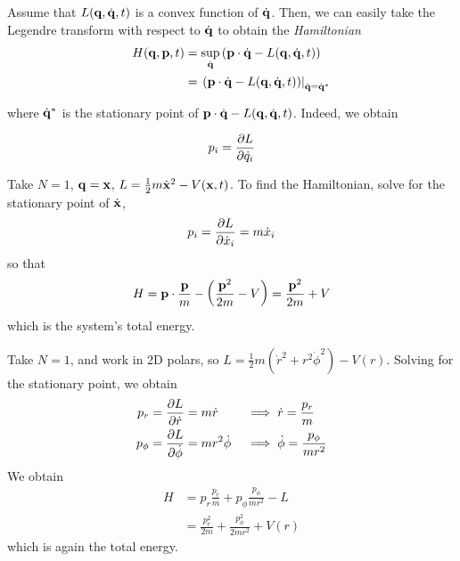 \documentclass{../template/note}
\begin{document}
    Assume that $L(\V q, \dot{\V q}, t)$ is a convex function of $\dot{\V q}$. Then, we can easily take the Legendre transform with respect to $\dot{\V q}$ to obtain the \emph{Hamiltonian}
    \begin{align*}
        H(\V q, \V p, t) &= \sup_{\dot{\V q}} \left(\V p \cdot \dot{\V q} - L(\V q, \dot{\V q}, t)\right) \\
        &= \left.\left(\V p \cdot \dot{\V q} - L(\V q, \dot{\V q}, t)\right)\right|_{\dot{\V q} = \dot{\V q}^*}
    \end{align*}
    
    where $\dot{\V q}^*$ is the stationary point of $\V p \cdot \dot{\V q} - L(\V q, \dot{\V q}, t)$. Indeed, we obtain

    \begin{proposition}
        \label{min-crit}
        \[
            p_i = \pd{L}{\dot q_i}
        \]
    \end{proposition}
    
    
    
    \begin{example*}
        Take $N=1$, $\V q = \V x$, $L = \frac 1 2 m \dot{\V x}^2 - V(\V x, t)$. To find the Hamiltonian, solve for the stationary point of $\dot{\V x}$,
        \begin{align*}
            p_i = \pd{L}{\dot x_i} = m \dot x_i
        \end{align*}
        so that
        \begin{align*}
            H = \V p \cdot \frac{\V p}{m} - \left(\frac{\V p^2}{2m} - V\right) = \frac{\V p^2}{2m} + V
        \end{align*}
        which is the system's total energy.       
    \end{example*}
    
    \begin{example*}
        Take $N=1$, and work in 2D polars, so $L = \frac 1 2 m(\dot r^2 + r^2 \dot \phi^2) - V(r)$. Solving for the stationary point, we obtain
        \begin{align*}
            p_r &= \pd{L}{\dot r} = m \dot r && \implies \dot r = \frac{p_r}{m} \\
            p_\phi &= \pd{L}{\dot \phi} = mr^2 \dot \phi && \implies \dot \phi = \frac{p_\phi}{mr^2}
        \end{align*}
        We obtain
        \begin{align*}
            H &= p_r \frac{p_r}{m} + p_\phi \frac{p_\phi}{mr^2} - L \\
            &= \frac{p_r^2}{2m} + \frac{p_\phi^2}{2mr^2} + V(r)
        \end{align*}
        which is again the total energy.       
    \end{example*}
    
\end{document}

